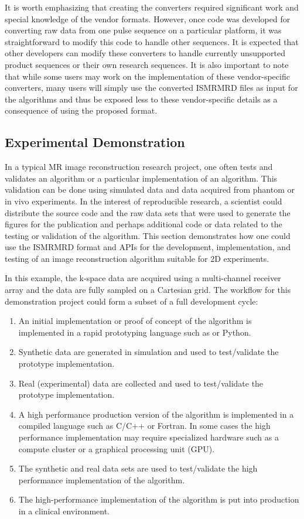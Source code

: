\documentclass[12pt, draft]{article}
\newcommand{\mreplaced}[2][None]{\replaced[remark=#1]{#2}}
\begin{document}
It is worth emphasizing that creating the converters required significant work and special knowledge of the vendor formats. However, once code was developed for converting raw data from one pulse sequence on a particular platform, it was straightforward to modify this code to handle other sequences. It is expected that other developers can modify these converters to handle currently unsupported product sequences or their own research sequences. It is also important to note that while some users may work on the implementation of these vendor-specific converters, many users will simply use the converted ISMRMRD files as input for the algorithms and thus be exposed less to these vendor-specific details as a consequence of using the proposed format. 

\subsection*{Experimental Demonstration}
In a typical MR image reconstruction research project, one often tests and validates an algorithm or a particular implementation of an algorithm. This validation can be done using simulated data and data acquired from phantom or in vivo experiments.  In the interest of reproducible research, a scientist could distribute the source code and the raw data sets that were used to generate the figures for the publication and perhaps additional code or data related to the testing or validation of the algorithm.
This section demonstrates how one could use the ISMRMRD format and APIs for the development, implementation, and testing of an image reconstruction algorithm suitable for 2D experiments.

In this example, the k-space data are acquired using a multi-channel receiver array and the data are fully sampled on a Cartesian grid.  The workflow for this demonstration project could form a subset of a full development cycle:
\begin{enumerate}
\item An initial implementation or proof of concept of the algorithm is implemented in a rapid prototyping language such as \mreplaced[R2.14]{MATLAB}{Matlab} or Python.
\item Synthetic data are generated in simulation and used to test/validate the prototype implementation.
\item Real (experimental) data are collected and used to test/validate the prototype implementation.
\item A high performance production version of the algorithm is implemented in a compiled language such as C/C++ or Fortran.  In some cases the high performance implementation may require specialized hardware such as a compute cluster or a graphical processing unit (GPU).
\item The synthetic and real data sets are used to test/validate the high performance implementation of the algorithm.
\item The high-performance implementation of the algorithm is put into production in a clinical environment.
\end{enumerate}
\end{document}
